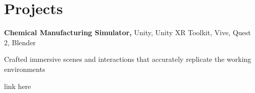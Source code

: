 \section{Projects}
\begin{onecolentry}
\textbf{Chemical Manufacturing Simulator,} Unity, Unity XR Toolkit, Vive, Quest 2, Blender 
\end{onecolentry}

\vspace{0.10 cm}
\begin{onecolentry}
    \begin{highlights}
        \item Crafted immersive scenes and interactions that accurately replicate the working environments
        \item link here
    \end{highlights}
\end{onecolentry}